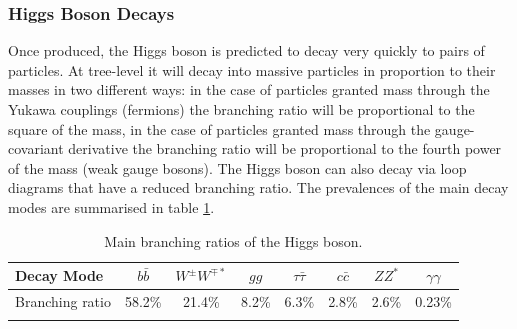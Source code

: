 \subsubsection{Higgs Boson Decays}
Once produced, the Higgs boson is predicted to decay very quickly \cite{HiggsLifetime} to pairs of particles. At tree-level it will decay into massive particles in proportion to their masses in two different ways: in the case of particles granted mass through the Yukawa couplings (fermions) the branching ratio will be proportional to the square of the mass, in the case of particles granted mass through the gauge-covariant derivative the branching ratio will be proportional to the fourth power of the mass (weak gauge bosons). 
The Higgs boson can also decay via loop diagrams that have a reduced branching ratio. The prevalences of the main decay modes \cite{HiggsBRs} are summarised in table \ref{tab:theory:higgs_branching_ratios}.
\begin{table}[h!]
    \centering
\renewcommand{\arraystretch}{1.3}
\begin{tabular}{ l | c c c c c c c}
    \thickhline
    Decay Mode & $b\bar{b}$ & $W^{\pm}W^{\mp*}$ & $gg$ & $\tau\bar{\tau}$ & $c\bar{c}$ & $ZZ^{*}$ & $\gamma\gamma$ \\
    \hline
    Branching ratio & 58.2\% & 21.4\% & 8.2\% & 6.3\% & 2.8\% & 2.6\% & 0.23\% \\
    \thickhline
\end{tabular}%
\caption{Main branching ratios of the Higgs boson.}
 \label{tab:theory:higgs_branching_ratios}
\end{table}

